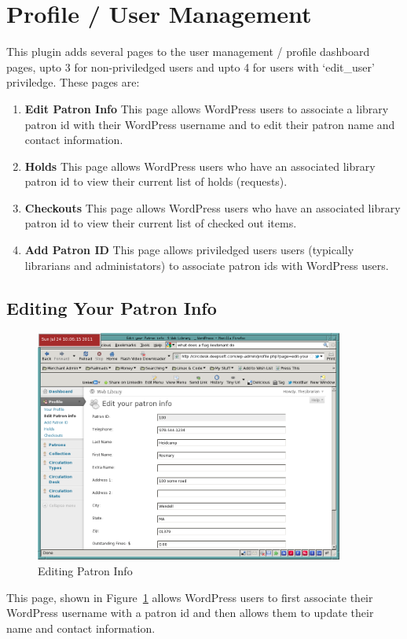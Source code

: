 \documentclass[letterpaper,twoside]{article}
\begin{document}
\section{Profile / User Management}

This plugin adds several pages to the user management / profile
dashboard pages, upto 3 for non-priviledged users and upto 4 for users
with `edit\_user' priviledge.  These pages are:
\begin{enumerate}
\item \textbf{Edit Patron Info} This page allows WordPress users to associate a
library patron id with their WordPress username and to edit their
patron name and contact information.
\item \textbf{Holds} This page allows WordPress users who have an
associated library patron id to view their current list of holds
(requests).
\item \textbf{Checkouts} This page allows WordPress users who have an
associated library patron id to view their current list of checked out
items.
\item \textbf{Add Patron ID} This page allows priviledged users users
(typically librarians and administators) to associate patron ids with
WordPress users.
\end{enumerate}

\subsection{Editing Your Patron Info}

\begin{figure}[htbp]
\begin{centering}
\includegraphics[width=4in]{EditPatronInfo.png}
\caption{Editing Patron Info}
\label{fig:EditPatronInfo}
\end{centering}
\end{figure}
This page, shown in Figure~\ref{fig:EditPatronInfo} allows WordPress
users to first associate their WordPress username with a patron id and
then allows them to update their name and contact information.
\end{document}
